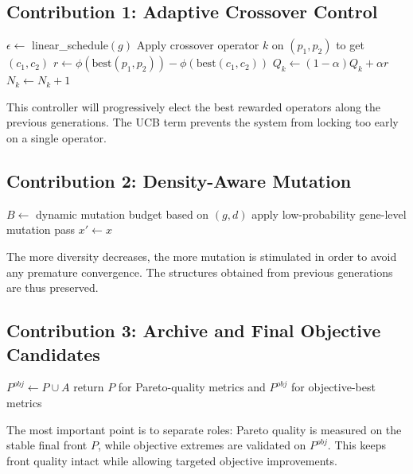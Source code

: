 \documentclass[conference]{IEEEtran}
\begin{document}
\subsection{Contribution 1: Adaptive Crossover Control}
\begin{algorithm}[t]
\small
\caption{Adaptive Crossover Selection (RL-guided)}
$\epsilon \leftarrow$ linear\_schedule$(g)$\;
Apply crossover operator $k$ on $(p_1,p_2)$ to get $(c_1,c_2)$\;
$r \leftarrow \phi(\text{best}(p_1,p_2))-\phi(\text{best}(c_1,c_2))$\;
$Q_k \leftarrow (1-\alpha)Q_k + \alpha r$\;
$N_k \leftarrow N_k+1$\;
\end{algorithm}
This controller will progressively elect the best rewarded operators along the previous generations. The UCB term prevents the system from locking too early on a single operator.

\subsection{Contribution 2: Density-Aware Mutation}
\begin{algorithm}[t]
\small
\caption{Density-Aware Adaptive Mutation}
$B \leftarrow$ dynamic mutation budget based on $(g,d)$\;
apply low-probability gene-level mutation pass\;
$x' \leftarrow x$\;
\end{algorithm}
The more diversity decreases, the more mutation is stimulated in order to avoid any premature convergence. The structures obtained from previous generations are thus preserved.

\subsection{Contribution 3: Archive and Final Objective Candidates}
\begin{algorithm}[t]
\small
\caption{Archive-Guided Final Objective Pool}
$P^{obj} \leftarrow P \cup A$\;
return $P$ for Pareto-quality metrics and $P^{obj}$ for objective-best metrics\;
\end{algorithm}
The most important point is to separate roles: Pareto quality is measured on the stable final front $P$, while objective extremes are validated on $P^{obj}$. This keeps front quality intact while allowing targeted objective improvements.
\end{document}
